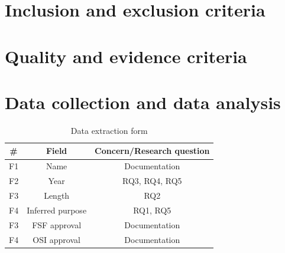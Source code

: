 \section{Inclusion and exclusion criteria}
\section{Quality and evidence criteria}
\section{Data collection and data analysis}
\begin{table}[t]
	\begin{center}
		\begin{tabular}{||c c c||} 
			\hline
			\# & Field & Concern/Research question \\
			\hline
			F1 & Name & Documentation \\
			F2 & Year & RQ3, RQ4, RQ5 \\
			F3 & Length & RQ2 \\
			F4 & Inferred purpose & RQ1, RQ5 \\
			F3 & FSF approval &  Documentation\\
			F4 & OSI approval & Documentation \\
			\hline
		\end{tabular}
		\caption{Data extraction form}
		\label{table:extraction}
	\end{center}
\end{table}
